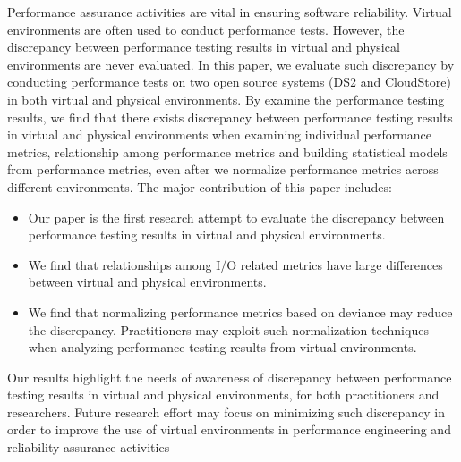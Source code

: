 Performance assurance activities are vital in ensuring software reliability. Virtual environments are often used to conduct performance tests. However, the discrepancy between performance testing results in virtual and physical environments are never evaluated. In this paper, we evaluate such discrepancy by conducting performance tests on two open source systems (DS2 and CloudStore) in both virtual and physical environments. By examine the performance testing results, we find that there exists discrepancy between performance testing results in virtual and physical environments when examining individual performance metrics, relationship among performance metrics and building statistical models from performance metrics, even after we normalize performance metrics across different environments. The major contribution of this paper includes: 
\begin{itemize} \itemsep -0.4pt 
	\item Our paper is the first research attempt to evaluate the discrepancy between performance testing results in virtual and physical environments.
	\item We find that relationships among I/O related metrics have large differences between virtual and physical environments.
	\item We find that normalizing performance metrics based on deviance may reduce the discrepancy. Practitioners may exploit such normalization techniques when analyzing performance testing results from virtual environments.
\end{itemize}
Our results highlight the needs of awareness of discrepancy between performance testing results in virtual and physical environments, for both practitioners and researchers. Future research effort may focus on minimizing such discrepancy in order to improve the use of virtual environments in performance engineering and reliability assurance activities




